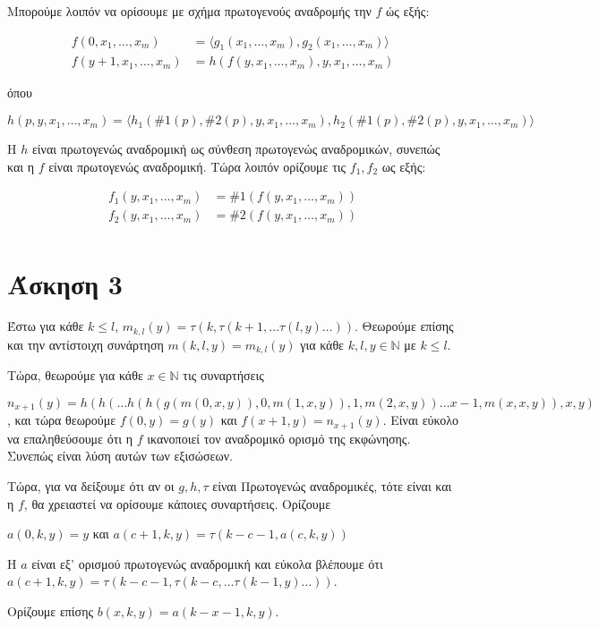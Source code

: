 \documentclass[a4paper, oneside, 11pt]{article}
\theoremstyle{definition}
\begin{document}
Μπορούμε λοιπόν να ορίσουμε με σχήμα πρωτογενούς αναδρομής την $f$ ώς εξής:

\begin{align*}
   f(0, x_1, \ldots, x_m) &= \langle g_1(x_1, \ldots, x_m), g_2(x_1, \ldots, x_m)
                             \rangle\\
   f(y+1, x_1, \ldots, x_m) &= h( f(y, x_1, \ldots, x_m), y, x_1, \ldots, x_m)
\end{align*}

όπου

\[ h( p, y, x_1, \ldots, x_m ) = \langle h_1( \#1(p), \#2(p), y, x_1, \ldots,
x_m), h_2(\#1(p), \#2(p), y, x_1, \ldots, x_m) \rangle \]

Η $h$ είναι πρωτογενώς αναδρομική ως σύνθεση πρωτογενώς αναδρομικών, συνεπώς και
η $f$ είναι πρωτογενώς αναδρομική. Τώρα λοιπόν ορίζουμε τις $f_1, f_2$ ως εξής:

\begin{align*}
   f_1(y, x_1, \ldots, x_m) &= \#1(f(y, x_1, \ldots, x_m))\\
   f_2(y, x_1, \ldots, x_m) &= \#2(f(y, x_1, \ldots, x_m))\\
\end{align*}

\section*{Άσκηση 3}
Έστω για κάθε $k\leq l$, 
$m_{k,l}(y)=\tau(k,\tau(k+1,\dots\tau(l,y)\dots))$. Θεωρούμε επίσης και την αντίστοιχη συνάρτηση $m(k,l,y)=m_{k,l}(y)$ για κάθε $k,l,y\in \mathbb{N}$ με $k\leq l$.

Τώρα, θεωρούμε για κάθε $x\in \mathbb{N}$ τις συναρτήσεις 

$n_{x+1}(y)=h(h(\dots h(h(g(m(0,x,y)),0,m(1,x,y)),1,m(2,x,y))\dots x-1,m(x,x,y)),x,y)$, και τώρα θεωρούμε
$f(0,y)=g(y)$ και $f(x+1,y)=n_{x+1}(y)$. Είναι εύκολο να επαληθεύσουμε ότι η $f$ ικανοποιεί τον αναδρομικό ορισμό της εκφώνησης. Συνεπώς είναι λύση αυτών των εξισώσεων.

Τώρα, για να δείξουμε ότι αν οι $g, h,\tau$ είναι Πρωτογενώς αναδρομικές, τότε είναι και η $f$, θα χρειαστεί να ορίσουμε κάποιες
συναρτήσεις.
Ορίζουμε

$a(0,k,y)=y$ και $a(c+1,k,y)=\tau(k-c-1,a(c,k,y))$

Η $a$ είναι εξ' ορισμού πρωτογενώς αναδρομική και εύκολα βλέπουμε ότι $a(c+1,k,y)=\tau(k-c-1,\tau(k-c,\dots\tau(k-1,y)\dots))$.

Ορίζουμε επίσης $b(x,k,y)=a(k-x-1,k,y)$. 
\end{document}
